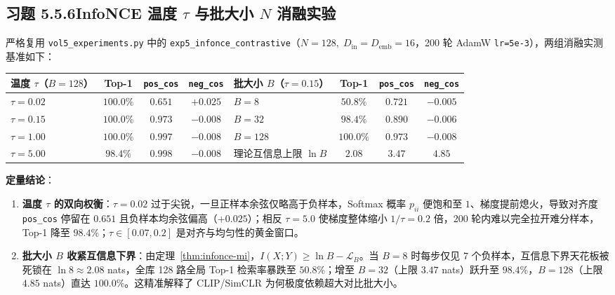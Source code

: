 \subsection*{习题 5.5.6\quad InfoNCE 温度 $\tau$ 与批大小 $N$ 消融实验}
严格复用 \texttt{vol5\_experiments.py} 中的 \texttt{exp5\_infonce\_contrastive}（$N = 128,\; D_{\text{in}} = D_{\text{emb}} = 16$，200 轮 AdamW \texttt{lr=5e-3}），两组消融实测基准如下：
\begin{center}
\small
\begin{tabular}{@{}lccc|lccc@{}}
\toprule
温度 $\tau$（$B=128$） & Top-1 & \texttt{pos\_cos} & \texttt{neg\_cos} & 批大小 $B$（$\tau=0.15$） & Top-1 & \texttt{pos\_cos} & \texttt{neg\_cos} \\
\midrule
$\tau = 0.02$ & $100.0\%$ & $0.651$ & $+0.025$ & $B = 8$ & $50.8\%$ & $0.721$ & $-0.005$ \\
$\tau = 0.15$ & $100.0\%$ & $0.973$ & $-0.008$ & $B = 32$ & $98.4\%$ & $0.890$ & $-0.006$ \\
$\tau = 1.00$ & $100.0\%$ & $0.997$ & $-0.008$ & $B = 128$ & $100.0\%$ & $0.973$ & $-0.008$ \\
$\tau = 5.00$ & $98.4\%$ & $0.998$ & $-0.008$ & 理论互信息上限 $\ln B$ & $2.08$ & $3.47$ & $4.85$ \\
\bottomrule
\end{tabular}
\end{center}
\textbf{定量结论}：
\begin{enumerate}[label=(\alph*), leftmargin=1.8em]
  \item \textbf{温度 $\tau$ 的双向权衡}：$\tau = 0.02$ 过于尖锐，一旦正样本余弦仅略高于负样本，Softmax 概率 $p_{ii}$ 便饱和至 $1$、梯度提前熄火，导致对齐度 \texttt{pos\_cos} 停留在 $0.651$ 且负样本均余弦偏高（$+0.025$）；相反 $\tau = 5.0$ 使梯度整体缩小 $1/\tau = 0.2$ 倍，200 轮内难以完全拉开难分样本，Top-1 降至 $98.4\%$；$\tau \in [0.07, 0.2]$ 是对齐与均匀性的黄金窗口。
  \item \textbf{批大小 $B$ 收紧互信息下界}：由定理~\ref{thm:infonce-mi}，$I(X; Y) \ge \ln B - \mathcal{L}_B$。当 $B=8$ 时每步仅见 $7$ 个负样本，互信息下界天花板被死锁在 $\ln 8 \approx 2.08$ nats，全库 128 路全局 Top-1 检索率暴跌至 $50.8\%$；增至 $B=32$（上限 $3.47$ nats）跃升至 $98.4\%$，$B=128$（上限 $4.85$ nats）直达 $100.0\%$。这精准解释了 CLIP/SimCLR 为何极度依赖超大对比批大小。
\end{enumerate}


